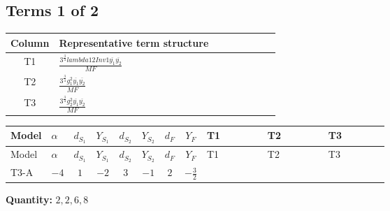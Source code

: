 \documentclass[8pt]{article}
\begin{document}
\begin{landscape}
\subsection*{Terms 1 of 2}
\begin{center}
\begin{tabular}{@{}c >{\raggedright\arraybackslash}p{0.82\linewidth}@{}}
\toprule
Column & Representative term structure \\
\midrule
T1 & \(\displaystyle \frac{3^{\frac{3}{4}} lambda12Inv1 \overline{y_{1}} \overline{y_{2}}}{MF}\) \\
\midrule
T2 & \(\displaystyle \frac{3^{\frac{3}{4}} g_{1}^{2} \overline{y_{1}} \overline{y_{2}}}{MF}\) \\
\midrule
T3 & \(\displaystyle \frac{3^{\frac{3}{4}} g_{2}^{2} \overline{y_{1}} \overline{y_{2}}}{MF}\) \\
\midrule
\bottomrule
\end{tabular}
\end{center}
\smallskip
\tiny
\begin{longtable}{@{}llcccccc >{\raggedright\arraybackslash}p{0.21\linewidth} >{\raggedright\arraybackslash}p{0.21\linewidth} >{\raggedright\arraybackslash}p{0.21\linewidth}@{}}
\toprule
Model & $\alpha$ & $d_{S_1}$ & $Y_{S_1}$ & $d_{S_2}$ & $Y_{S_2}$ & $d_F$ & $Y_F$ & T1 & T2 & T3 \\
\midrule
\endfirsthead
\toprule
Model & $\alpha$ & $d_{S_1}$ & $Y_{S_1}$ & $d_{S_2}$ & $Y_{S_2}$ & $d_F$ & $Y_F$ & T1 & T2 & T3 \\
\midrule
\endhead
T3-A & $-4$ & $1$ & $-2$ & $3$ & $-1$ & $2$ & $-\frac{3}{2}$ & \scriptsize\adjustbox{max width=\linewidth}{$\begin{gathered} \frac{3^{\frac{3}{4}} lambda12Inv1 \overline{y_{1}} \overline{y_{2}}}{6 MF}\end{gathered}$} & \scriptsize\adjustbox{max width=\linewidth}{$\begin{gathered} \frac{9 \cdot 3^{\frac{3}{4}} g_{1}^{2} \overline{y_{1}} \overline{y_{2}}}{8 MF}\end{gathered}$} & \scriptsize\adjustbox{max width=\linewidth}{$\begin{gathered} \frac{17 \cdot 3^{\frac{3}{4}} g_{2}^{2} \overline{y_{1}} \overline{y_{2}}}{24 MF}\end{gathered}$} \\
\midrule
\bottomrule
\end{longtable}
\clearpage
\noindent\textbf{Quantity: }$\mathrm{2,2,6,8}$\par\smallskip

\end{landscape}
\end{document}
